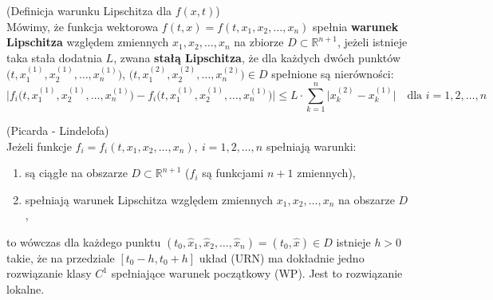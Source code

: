 \begin{df}{(Definicja warunku Lipschitza dla $f(x,t)$)}\\
Mówimy, że funkcja wektorowa $f(t,x)=f(t,x_1,x_2,\ldots,x_n)$ spełnia \textbf{warunek Lipschitza} względem zmiennych $x_1,x_2,\ldots,x_n$ na zbiorze $D\subset\mathbb{R}^{n+1}$, jeżeli istnieje taka stała dodatnia $L$, zwana \textbf{stałą Lipschitza}, że dla każdych dwóch punktów $\Big(t,x_1^{(1)},x_2^{(1)},\ldots,x_n^{(1)}\Big)$,  $\Big(t,x_1^{(2)},x_2^{(2)},\ldots,x_n^{(2)}\Big)\in D$ spełnione są nierówności: $$\Big|f_i\Big(t,x_1^{(1)},x_2^{(1)},\ldots,x_n^{(1)}\Big)-f_i\Big(t,x_1^{(1)},x_2^{(1)},\ldots,x_n^{(1)}\Big)\Big|\leqslant L\cdot\sum_{k=1}^n\Big|x_k^{(2)}-x_k^{(1)}\Big|\quad\textrm{dla }i=1,2,\ldots,n$$
\end{df}

\begin{tw}{(Picarda - Lindelofa)}\\
Jeżeli funkcje $f_i=f_i(t,x_1,x_2,\ldots,x_n),\ i=1,2,\ldots,n$ spełniają warunki:
\begin{enumerate}[\rm 1)]
\item
są ciągłe na obszarze $D\subset\mathbb{R}^{n+1}$ ($f_i$ są funkcjami $n+1$ zmiennych),
\item
spełniają warunek Lipschitza względem zmiennych $x_1,x_2,\ldots,x_n$ na obszarze $D$,
\end{enumerate}
to wówczas dla każdego punktu $(t_0,\hat{x}_1,\hat{x}_2,\ldots,\hat{x}_n)=(t_0,\hat{x})\in D$ istnieje $h>0$ takie, że na przedziale $[t_0-h,t_0+h]$ układ (URN) ma dokładnie jedno rozwiązanie klasy $C^1$ spełniające warunek początkowy (WP). Jest to rozwiązanie lokalne.
\end{tw}

